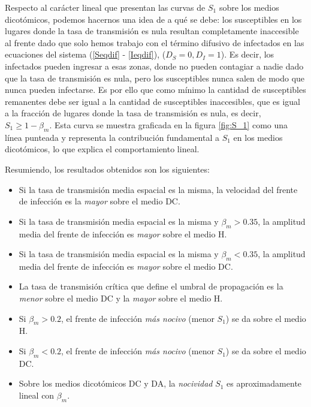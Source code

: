 Respecto al carácter lineal que presentan las curvas de $S_1$ sobre los medios dicotómicos, podemos hacernos una idea de a qué se debe: los susceptibles en los lugares donde la tasa de transmisión es nula resultan completamente inaccesible al frente dado que solo hemos trabajo con el término difusivo de infectados en las ecuaciones del sistema (\ref{Seqdif} - \ref{Ieqdif}), ($D_S = 0,D_I=1$). Es decir, los infectados pueden ingresar a esas zonas, donde no pueden contagiar a nadie dado que la tasa de transmisión es nula, pero los susceptibles nunca salen de modo que nunca pueden infectarse. Es por ello que como mínimo la cantidad de susceptibles remanentes debe ser igual a la cantidad de susceptibles inaccesibles, que es igual a la fracción de lugares donde la tasa de transmisión es nula, es decir, $S_1\geq 1-\beta_m$. Esta curva se muestra graficada en la figura \ref{fig:S_1} como una línea punteada y representa la contribución fundamental a $S_1$ en los medios dicotómicos, lo que explica el comportamiento lineal.

Resumiendo, los resultados obtenidos son los siguientes:
\begin{itemize}
    \item Si la tasa de transmisión media espacial es la misma, la velocidad del frente de infección es la \textit{mayor} sobre el medio DC.
    \item Si la tasa de transmisión media espacial es la misma y $\beta_m>0.35$, la amplitud media del frente de infección es \textit{mayor} sobre el medio H.
    \item Si la tasa de transmisión media espacial es la misma y $\beta_m<0.35$, la amplitud media del frente de infección es \textit{mayor} sobre el medio DC.
    \item La tasa de transmisión crítica que define el umbral de propagación es la \textit{menor} sobre el medio DC y la \textit{mayor} sobre el medio H.
    \item Si $\beta_m>0.2$, el frente de infección \textit{más nocivo} (menor $S_1$) se da sobre el medio H.
    \item Si $\beta_m<0.2$, el frente de infección \textit{más nocivo} (menor $S_1$) se da sobre el medio DC.
    \item Sobre los medios dicotómicos DC y DA, la \textit{nocividad} $S_1$ es aproximadamente lineal con $\beta_m$.
\end{itemize}


